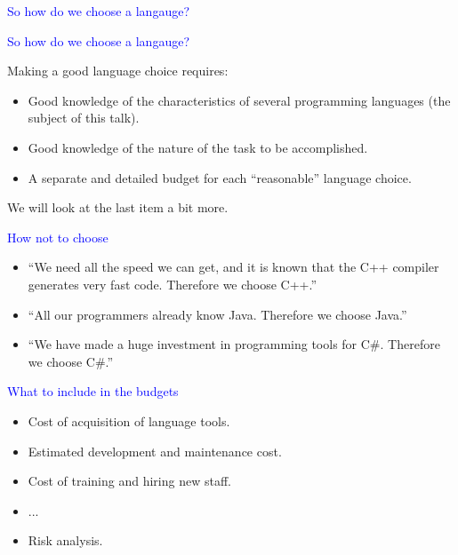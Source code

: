 \documentclass{slides}
\newcommand{\ti}[1]{\begin{center}\Large{\textcolor{blue}{#1}}\end{center}}
\begin{document}
\begin{slide}\ti{So how do we choose a langauge?}

\vfill\end{slide}
\begin{slide}\ti{So how do we choose a langauge?}

Making a good language choice requires:

\begin{itemize}
\item Good knowledge of the characteristics of several programming
  languages (the subject of this talk).
\item Good knowledge of the nature of the task to be accomplished.
\item A separate and detailed budget for each ``reasonable'' language
  choice.
\end{itemize}

We will look at the last item a bit more.

\vfill\end{slide}
\begin{slide}\ti{How not to choose}

  \begin{itemize}
  \item ``We need all the speed we can get, and it is known that the
    C++ compiler generates very fast code.  Therefore we choose C++.''
  \item ``All our programmers already know Java.  Therefore we choose
    Java.''
  \item ``We have made a huge investment in programming tools for
    C\#.  Therefore we choose C\#.''
  \end{itemize}

\vfill\end{slide}
\begin{slide}\ti{What to include in the budgets}

  \begin{itemize}
  \item Cost of acquisition of language tools.
  \item Estimated development and maintenance cost.
  \item Cost of training and hiring new staff.
  \item ...
  \item Risk analysis.
  \end{itemize}

\vfill\end{slide}
\end{document}
